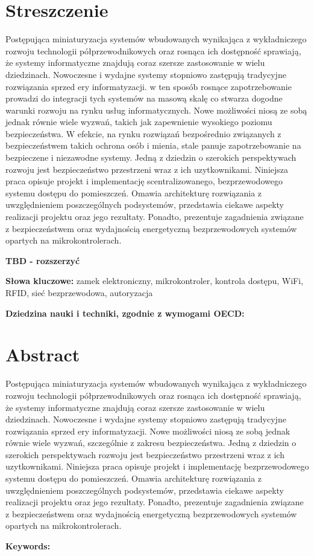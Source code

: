 \section*{Streszczenie}
	Postępująca miniaturyzacja systemów wbudowanych wynikająca z wykładniczego rozwoju technologii półprzewodnikowych oraz rosnąca ich dostępność sprawiają, że systemy informatyczne znajdują coraz szersze zastosowanie w wielu dziedzinach. Nowoczesne i wydajne systemy stopniowo zastępują tradycyjne rozwiązania sprzed ery informatyzacji. w ten sposób rosnące zapotrzebowanie prowadzi do integracji tych systemów na masową skalę co stwarza dogodne warunki rozwoju na rynku usług informatycznych. Nowe możliwości niosą ze sobą jednak równie wiele wyzwań, takich jak zapewnienie wysokiego poziomu bezpieczeństwa. W efekcie, na rynku rozwiązań bezpośrednio związanych z bezpieczeństwem takich ochrona osób i mienia, stale panuje zapotrzebowanie na bezpieczene i niezawodne systemy. Jedną z dziedzin o szerokich perspektywach rozwoju jest bezpieczeństwo przestrzeni wraz z ich uzytkownikami. Niniejsza praca opisuje projekt i implementację scentralizowanego, bezprzewodowego systemu dostępu do pomieszczeń. Omawia architekturę rozwiązania z uwzględnieniem poszczególnych podsystemów, przedstawia ciekawe aspekty realizacji projektu oraz jego rezultaty. Ponadto, prezentuje zagadnienia związane z bezpieczeństwem oraz wydajnością energetyczną bezprzewodowych systemów opartych na mikrokontrolerach.

	\textbf{TBD - rozszerzyć}

	\textbf{Słowa kluczowe:} zamek elektroniczny, mikrokontroler, kontrola dostępu, WiFi, RFID, sieć bezprzewodowa, autoryzacja

	\textbf{Dziedzina nauki i techniki, zgodnie z wymogami OECD:}

\section*{Abstract}
	Postępująca miniaturyzacja systemów wbudowanych wynikająca z wykładniczego rozwoju technologii półprzewodnikowych oraz rosnąca ich dostępność sprawiają, że systemy informatyczne znajdują coraz szersze zastosowanie w wielu dziedzinach. Nowoczesne i wydajne systemy stopniowo zastępują tradycyjne rozwiązania sprzed ery informatyzacji. Nowe możliwości niosą ze sobą jednak równie wiele wyzwań, szczególnie z zakresu bezpieczeństwa. Jedną z dziedzin o szerokich perspektywach rozwoju jest bezpieczeństwo przestrzeni wraz z ich uzytkownikami. Niniejsza praca opisuje projekt i implementację bezprzewodowego systemu dostępu do pomieszczeń. Omawia architekturę rozwiązania z uwzględnieniem poszczególnych podsystemów, przedstawia ciekawe aspekty realizacji projektu oraz jego rezultaty. Ponadto, prezentuje zagadnienia związane z bezpieczeństwem oraz wydajnością energetyczną bezprzewodowych systemów opartych na mikrokontrolerach.

	\textbf{Keywords:}